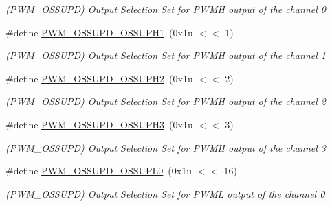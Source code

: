 \begin{DoxyCompactItemize}
\begin{DoxyCompactList}\small\item\em (P\+W\+M\+\_\+\+O\+S\+S\+U\+PD) Output Selection Set for P\+W\+MH output of the channel 0 \end{DoxyCompactList}\item 
\mbox{\label{group__SAMV71__PWM_ga2fb78ee3b72236f21a37dcf5c45f6347}} 
\#define \mbox{\hyperlink{group__SAMV71__PWM_ga2fb78ee3b72236f21a37dcf5c45f6347}{P\+W\+M\+\_\+\+O\+S\+S\+U\+P\+D\+\_\+\+O\+S\+S\+U\+P\+H1}}~(0x1u $<$$<$ 1)
\begin{DoxyCompactList}\small\item\em (P\+W\+M\+\_\+\+O\+S\+S\+U\+PD) Output Selection Set for P\+W\+MH output of the channel 1 \end{DoxyCompactList}\item 
\mbox{\label{group__SAMV71__PWM_gabd9957d849685620c2b1386135c01bfe}} 
\#define \mbox{\hyperlink{group__SAMV71__PWM_gabd9957d849685620c2b1386135c01bfe}{P\+W\+M\+\_\+\+O\+S\+S\+U\+P\+D\+\_\+\+O\+S\+S\+U\+P\+H2}}~(0x1u $<$$<$ 2)
\begin{DoxyCompactList}\small\item\em (P\+W\+M\+\_\+\+O\+S\+S\+U\+PD) Output Selection Set for P\+W\+MH output of the channel 2 \end{DoxyCompactList}\item 
\mbox{\label{group__SAMV71__PWM_ga205af3b8a9ec5ffab21ef4cb55df79bf}} 
\#define \mbox{\hyperlink{group__SAMV71__PWM_ga205af3b8a9ec5ffab21ef4cb55df79bf}{P\+W\+M\+\_\+\+O\+S\+S\+U\+P\+D\+\_\+\+O\+S\+S\+U\+P\+H3}}~(0x1u $<$$<$ 3)
\begin{DoxyCompactList}\small\item\em (P\+W\+M\+\_\+\+O\+S\+S\+U\+PD) Output Selection Set for P\+W\+MH output of the channel 3 \end{DoxyCompactList}\item 
\mbox{\label{group__SAMV71__PWM_gac35e76bcb2b7795022e5117eec690bfc}} 
\#define \mbox{\hyperlink{group__SAMV71__PWM_gac35e76bcb2b7795022e5117eec690bfc}{P\+W\+M\+\_\+\+O\+S\+S\+U\+P\+D\+\_\+\+O\+S\+S\+U\+P\+L0}}~(0x1u $<$$<$ 16)
\begin{DoxyCompactList}\small\item\em (P\+W\+M\+\_\+\+O\+S\+S\+U\+PD) Output Selection Set for P\+W\+ML output of the channel 0 \end{DoxyCompactList}\item 

\end{DoxyCompactItemize}
